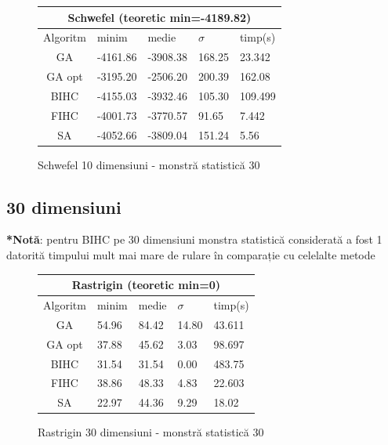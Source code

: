 \documentclass{article}
\begin{document}
\begin{figure}[!h]
\begin{tabular}{||c|||l|l|l|l||}
  \hline
  \multicolumn{5}{||c||}{Schwefel (teoretic min=-4189.82)} \\ \hline
  Algoritm & minim & medie & $\sigma$ & timp(s) \\ \hline \hline
  GA & -4161.86 & -3908.38 & 168.25 & 23.342 \\ \hline
  GA opt & -3195.20 & -2506.20 & 200.39 & 162.08 \\ \hline
  BIHC & -4155.03 & -3932.46 & 105.30 & 109.499\\ \hline
  FIHC & -4001.73 & -3770.57 & 91.65 & 7.442 \\ \hline
  SA & -4052.66 & -3809.04 & 151.24 & 5.56 \\ \hline
\end{tabular}
\caption{Schwefel 10 dimensiuni - monstră statistică 30} 
\end{figure}


\subsection{30 dimensiuni}

\textbf{*Notă}: pentru BIHC pe 30 dimensiuni monstra statistică considerată a fost 1 datorită timpului mult mai mare de rulare în comparație cu celelalte metode
\begin{figure}[!h]
\begin{tabular}{||c|||l|l|l|l||}
  \hline
  \multicolumn{5}{||c||}{Rastrigin (teoretic min=0)} \\ \hline
  Algoritm & minim & medie & $\sigma$ & timp(s) \\ \hline \hline
  GA & 54.96 & 84.42 & 14.80 & 43.611 \\ \hline
  GA opt & 37.88 & 45.62 & 3.03 & 98.697 \\ \hline
  BIHC & 31.54 & 31.54 & 0.00 & 483.75\\ \hline
  FIHC & 38.86 & 48.33 & 4.83 & 22.603 \\ \hline
  SA & 22.97 & 44.36 & 9.29 & 18.02 \\ \hline
\end{tabular}
\caption{Rastrigin 30 dimensiuni - monstră statistică 30} 
\end{figure}
\end{document}
